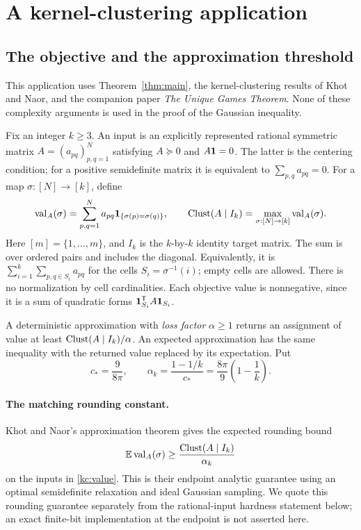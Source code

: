\section{A kernel-clustering application}\label{kc:section}

\subsection{The objective and the approximation threshold}

This application uses Theorem~\ref{thm:main},
the kernel-clustering results of Khot and Naor, and the companion paper
\emph{The Unique Games Theorem}. None of these complexity arguments is used
in the proof of the Gaussian inequality.

Fix an integer \(k\ge3\). An input is an explicitly represented rational
symmetric matrix \(A=(a_{pq})_{p,q=1}^N\) satisfying
\(A\succeq0\) and \(A\mathbf 1=0\). The latter is the centering condition;
for a positive semidefinite matrix it is equivalent to
\(\sum_{p,q}a_{pq}=0\). For a map \(\sigma:[N]\to[k]\), define
\begin{equation}\label{kc:value}
 \operatorname{val}_A(\sigma)=\sum_{p,q=1}^N a_{pq}\mathbf 1_{\{\sigma(p)=\sigma(q)\}},
 \qquad
 \operatorname{Clust}(A\mid I_k)=\max_{\sigma:[N]\to[k]}\operatorname{val}_A(\sigma).
\end{equation}
Here \([m]=\{1,\ldots,m\}\), and \(I_k\) is the \(k\)-by-\(k\)
identity target matrix. The sum is over ordered pairs and includes the
diagonal. Equivalently, it is
\(\sum_{i=1}^k\sum_{p,q\in S_i}a_{pq}\) for the cells
\(S_i=\sigma^{-1}(i)\); empty cells are allowed. There is no
normalization by cell cardinalities. Each objective value is nonnegative,
since it is a sum of quadratic forms \(\mathbf 1_{S_i}^{\mathsf T}A\mathbf 1_{S_i}\).

A deterministic approximation with \emph{loss factor} \(\alpha\ge1\)
returns an assignment of value at least
\(\operatorname{Clust}(A\mid I_k)/\alpha\). An expected approximation has the same
inequality with the returned value replaced by its expectation.
Put
\[
 c_*=\frac9{8\pi},
 \qquad
 \alpha_k=\frac{1-1/k}{c_*}
          =\frac{8\pi}{9}\left(1-\frac1k\right).
\]

\paragraph{The matching rounding constant.}
Khot and Naor's approximation theorem
\cite[Theorem~2.1]{KhotNaor}
gives the expected rounding bound
\[
 \mathbb E\operatorname{val}_A(\sigma)\ge\frac{\operatorname{Clust}(A\mid I_k)}{\alpha_k}
\]
on the inputs in \eqref{kc:value}. This is their endpoint analytic
guarantee using an optimal semidefinite relaxation and ideal Gaussian
sampling. We quote this rounding guarantee separately from the
rational-input hardness statement below; an exact finite-bit
implementation at the endpoint is not asserted here.

